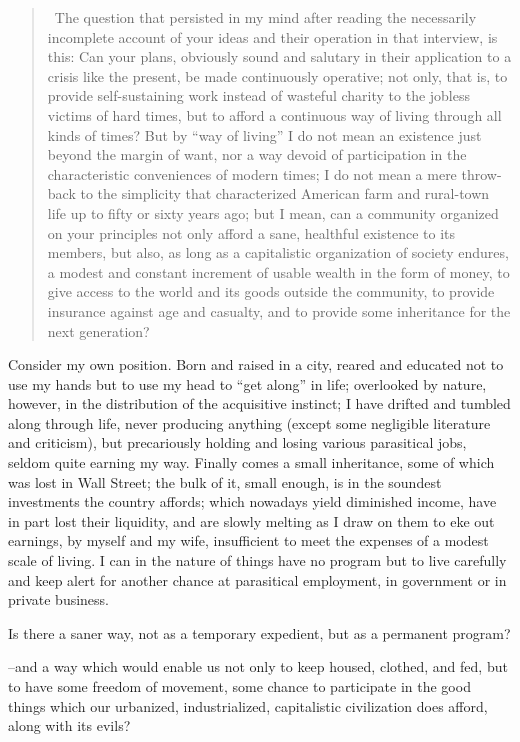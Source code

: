 \documentclass{book}
\begin{document}
\begin{quotation}\
	The question that persisted in my mind after reading the necessarily incomplete account of your ideas and their operation in that interview, is this: Can your plans, obviously sound and salutary in their application to a crisis like the present, be made continuously operative; not only, that is, to provide self-sustaining work instead of wasteful charity to the jobless victims of hard times, but to afford a continuous way of living through all kinds of times? But by “way of living” I do not mean an existence just beyond the margin of want, nor a way devoid of participation in the characteristic conveniences of modern times; I do not mean a mere throw-back to the simplicity that characterized American farm and rural-town life up to fifty or sixty years ago; but I mean, can a community organized on your principles not only afford a sane, healthful existence to its members, but also, as long as a capitalistic organization of society endures, a modest and constant increment of usable wealth in the form of money, to give access to the world and its goods outside the community, to provide insurance against age and casualty, and to provide some inheritance for the next generation?
\end{quotation}

Consider my own position. Born and raised in a city, reared and educated not to use my hands but to use my head to “get along” in life; overlooked by nature, however, in the distribution of the acquisitive instinct; I have drifted and tumbled along through life, never producing anything (except some negligible literature and criticism), but precariously holding and losing various parasitical jobs, seldom quite earning my way. Finally comes a small inheritance, some of which was lost in Wall Street; the bulk of it, small enough, is in the soundest investments the country affords; which nowadays yield diminished income, have in part lost their liquidity, and are slowly melting as I draw on them to eke out earnings, by myself and my wife, insufficient to meet the expenses of a modest scale of living. I can in the nature of things have no program but to live carefully and keep alert for another chance at parasitical employment, in government or in private business.

Is there a saner way, not as a temporary expedient, but as a permanent program?

–and a way which would enable us not only to keep housed, clothed, and fed, but to have some freedom of movement, some chance to participate in the good things which our urbanized, industrialized, capitalistic civilization does afford, along with its evils?
\end{document}
